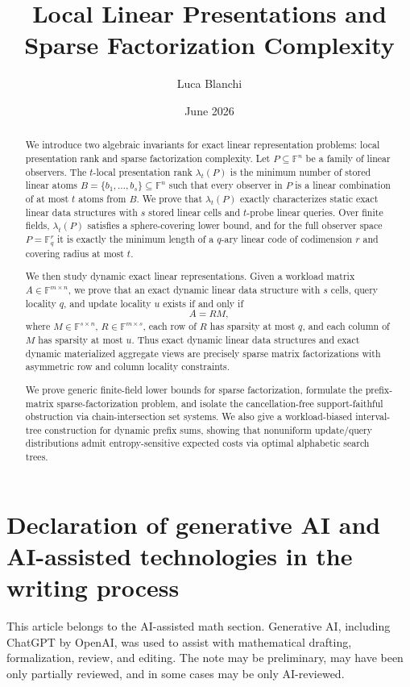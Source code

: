 \documentclass[11pt]{article}
\title{Local Linear Presentations and Sparse Factorization Complexity}
\author{Luca Blanchi}
\date{June 2026}
\begin{document}
\maketitle

\begin{abstract}
We introduce two algebraic invariants for exact linear representation problems: local presentation rank and sparse factorization complexity. Let $P\subseteq \mathbb F^n$ be a family of linear observers. The $t$-local presentation rank $\lambda_t(P)$ is the minimum number of stored linear atoms $B=\{b_1,\ldots,b_s\}\subseteq \mathbb F^n$ such that every observer in $P$ is a linear combination of at most $t$ atoms from $B$. We prove that $\lambda_t(P)$ exactly characterizes static exact linear data structures with $s$ stored linear cells and $t$-probe linear queries. Over finite fields, $\lambda_t(P)$ satisfies a sphere-covering lower bound, and for the full observer space $P=\mathbb F_q^r$ it is exactly the minimum length of a $q$-ary linear code of codimension $r$ and covering radius at most $t$.

We then study dynamic exact linear representations. Given a workload matrix $A\in \mathbb F^{m\times n}$, we prove that an exact dynamic linear data structure with $s$ cells, query locality $q$, and update locality $u$ exists if and only if
\[
A=RM,
\]
where $M\in\mathbb F^{s\times n}$, $R\in\mathbb F^{m\times s}$, each row of $R$ has sparsity at most $q$, and each column of $M$ has sparsity at most $u$. Thus exact dynamic linear data structures and exact dynamic materialized aggregate views are precisely sparse matrix factorizations with asymmetric row and column locality constraints.

We prove generic finite-field lower bounds for sparse factorization, formulate the prefix-matrix sparse-factorization problem, and isolate the cancellation-free support-faithful obstruction via chain-intersection set systems. We also give a workload-biased interval-tree construction for dynamic prefix sums, showing that nonuniform update/query distributions admit entropy-sensitive expected costs via optimal alphabetic search trees.
\end{abstract}

\section*{Declaration of generative AI and AI-assisted technologies in the writing process}
This article belongs to the AI-assisted math section. Generative AI, including ChatGPT by \mbox{OpenAI}, was used to assist with mathematical drafting, formalization, review, and editing. The note may be preliminary, may have been only partially reviewed, and in some cases may be only AI-reviewed.
\end{document}
